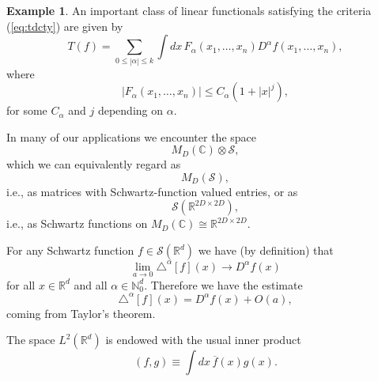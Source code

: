 \documentclass[prl,twocolumn,lengthcheck,superscriptaddress]{revtex4-1}
\theoremstyle{definition}
\newtheorem{example}{Example}
\theoremstyle{remark}
\begin{document}
\begin{example}
	An important class of linear functionals satisfying the criteria (\ref{eq:tdcty}) are given by
	\begin{equation}
		T(f) = \sum_{0 \le |\alpha| \le k} \int dx\, F_\alpha(x_1, \ldots, x_n) D^\alpha f(x_1, \ldots, x_n),
	\end{equation}
	where
	\begin{equation}
		|F_\alpha(x_1, \ldots, x_n)| \le C_\alpha (1+|x|^j),
	\end{equation}
	for some $C_\alpha$ and $j$ depending on $\alpha$.
\end{example}

In many of our applications we encounter the space
\begin{equation}
	M_D(\mathbb{C})\otimes \mathscr{S},
\end{equation}
which we can equivalently regard as 
\begin{equation}
	M_D(\mathscr{S}),
\end{equation}
i.e., as matrices with Schwartz-function valued entries, or as 
\begin{equation}
	\mathscr{S}(\mathbb{R}^{2D\times 2D}),
\end{equation}
i.e., as Schwartz functions on $M_D(\mathbb{C}) \cong \mathbb{R}^{2D\times 2D}$.

For any Schwartz function $f\in \mathcal{S}(\mathbb{R}^d)$ we have (by definition) that
\begin{equation}
	\lim_{a\rightarrow 0} \triangle^{\alpha}[f](x) \rightarrow D^{\alpha} f(x)
\end{equation}
for all $x\in\mathbb{R}^d$ and all $\alpha\in\mathbb{N}_0^d$. Therefore we have the estimate
\begin{equation}
	\triangle^{\alpha}[f](x) = D^{\alpha} f(x) + O(a),
\end{equation}
coming from Taylor's theorem.

The space $L^2(\mathbb{R}^d)$ is endowed with the usual inner product
\begin{equation}
	(f,g) \equiv \int dx \, \overline{f}(x) g(x).
\end{equation}
\end{document}
